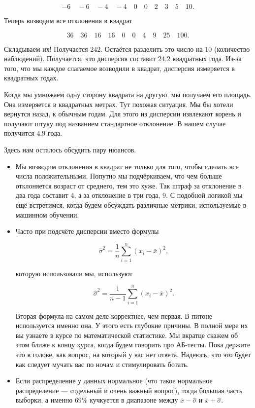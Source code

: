 \documentclass[12pt, a4paper, oneside]{article}
\begin{document}
{\begin{enumerate}
	\[
	-6 \quad -6  \quad -4  \quad -4  \quad 0  \quad 0 \quad 2  \quad 3  \quad 5  \quad 10.
	\]
	
	Теперь возводим все отклонения в квадрат
	
	\[
	36 \quad 36  \quad 16  \quad 16 \quad 0  \quad 0 \quad 4  \quad 9 \quad 25  \quad 100.
	\]
	
	Складываем их! Получается $242$. Остаётся разделить это число на  $10$ (количество наблюдений). Получается, что дисперсия составит $24.2$ квадратных года.  Из-за того, что мы каждое слагаемое возводили в квадрат, дисперсия измеряется в квадратных годах.  
	
	Когда мы умножаем одну сторону квадрата на другую, мы получаем его площадь. Она измеряется в квадратных метрах. Тут похожая ситуация. Мы бы хотели вернутся назад, к обычным годам. Для этого из дисперсии извлекают корень и получают штуку под названием стандартное отклонение.  В нашем случае получится $4.9$ года. 
	
	Здесь нам осталось обсудить пару нюансов. 
	
	\begin{itemize}
		\item  Мы возводим отклонения в квадрат не только для того, чтобы сделать все числа положительными. Попутно мы подчёркиваем, что чем больше отклоняется возраст от среднего, тем это хуже. Так штраф за отклонение в два года составит $4$, а за отклонение в три года, $9$.  С подобной логикой мы ещё встретимся, когда будем обсуждать различные метрики, используемые в машинном обучении. 
		
		\item Часто при подсчёте дисперсии вместо формулы 
		
		\[ 
		\hat \sigma^2 = \frac{1}{n} \sum_{i=1}^n (x_i - \bar x)^2,
		\]
		
		которую использовали мы, используют 
		
		\[ 
		\hat \sigma^2 = \frac{1}{n-1} \sum_{i=1}^n (x_i - \bar x)^2.
		\]
		
		Вторая формула на самом деле корректнее, чем первая.  В питоне используется именно она. У этого есть глубокие причины. В полной мере их вы узнаете в курсе по математической статистике. Мы вкратце скажем об этом ближе к концу курса, когда будем говорить про АБ-тесты. Пока держите это в голове, как вопрос, на который у вас нет ответа. Надеюсь, что это будет как следует мучать вас по ночам и стимулировать ботать. 
		
		\item Если распределение у данных нормальное (что такое нормальное распределение --- отдельный и очень важный вопрос), тогда  большая часть выборки, а именно $69\%$ кучкуется в диапазоне между $\bar x - \hat \sigma$ и $\bar x + \hat \sigma$.  
		

\end{itemize}
\end{enumerate}}
\end{document}
